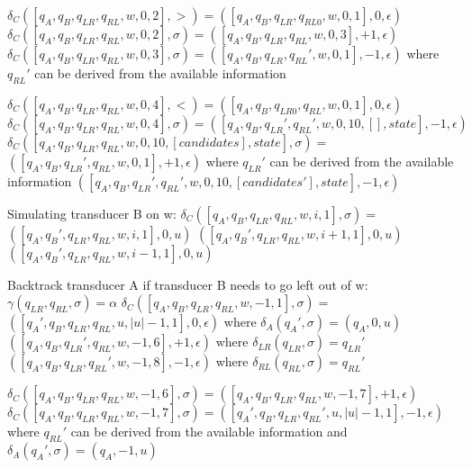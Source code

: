 \documentclass[12pt, a4paper]{article}
\begin{document}
\begin{algorithmic}
    \STATE $\delta_C([q_A, q_B, q_{LR}, q_{RL}, w, 0, 2], >) = ([q_A, q_B, q_{LR}, q_{RL0}, w, 0, 1], 0, \epsilon)$
    \STATE $\delta_C([q_A, q_B, q_{LR}, q_{RL}, w, 0, 2], \sigma) = ([q_A, q_B, q_{LR}, q_{RL}, w, 0, 3], +1, \epsilon)$
    \STATE $\delta_C([q_A, q_B, q_{LR}, q_{RL}, w, 0, 3], \sigma) = ([q_A, q_B, q_{LR}, q_{RL}', w, 0, 1], -1, \epsilon)$ where $q_{RL}'$ can be derived from the available information

    \STATE $\delta_C([q_A, q_B, q_{LR}, q_{RL}, w, 0, 4], <) = ([q_A, q_B, q_{LR0}, q_{RL}, w, 0, 1], 0, \epsilon)$
    \STATE $\delta_C([q_A, q_B, q_{LR}, q_{RL}, w, 0, 4], \sigma) = ([q_A, q_B, q_{LR}', q_{RL}', w, 0, 10, [], state], -1, \epsilon)$
    \STATE $\delta_C([q_A, q_B, q_{LR}, q_{RL}, w, 0, 10, [candidates], state], \sigma) = $
            \STATE $([q_A, q_B, q_{LR}', q_{RL}, w, 0, 1], +1, \epsilon)$ where $q_{LR}'$ can be derived from the available information
        \ELSE
            \STATE $([q_A, q_B, q_{LR}', q_{RL}', w, 0, 10, [candidates'], state], -1, \epsilon)$
        \ENDIF

    

    \STATE Simulating transducer B on w:
    \STATE $\delta_C([q_A, q_B, q_{LR}, q_{RL}, w, i, 1], \sigma) = $
            \STATE $([q_A, q_B', q_{LR}, q_{RL}, w, i, 1], 0, u)$ 
            \STATE $([q_A, q_B', q_{LR}, q_{RL}, w, i+1, 1], 0, u)$ 
            \STATE $([q_A, q_B', q_{LR}, q_{RL}, w, i-1, 1], 0, u)$ 
        \ENDIF

    \STATE Backtrack transducer A if transducer B needs to go left out of w:
    \STATE $\gamma(q_{LR}, q_{RL}, \sigma) = \alpha$
    \STATE $\delta_C([q_A, q_B, q_{LR}, q_{RL}, w, -1, 1], \sigma) = $\\
        \STATE $([q_A', q_B, q_{LR}, q_{RL}, u, |u| - 1, 1], 0, \epsilon)$ where $\delta_A(q_A', \sigma) = (q_A, 0, u)$
        \STATE $([q_A, q_B, q_{LR}', q_{RL}, w, -1, 6], +1, \epsilon)$ where $\delta_{LR}(q_{LR}, \sigma) = q_{LR}'$
        \STATE $([q_A, q_B, q_{LR}, q_{RL}', w, -1, 8], -1, \epsilon)$ where $\delta_{RL}(q_{RL}, \sigma) = q_{RL}'$
    \ENDIF

    \STATE $\delta_C([q_A, q_B, q_{LR}, q_{RL}, w, -1, 6], \sigma) = ([q_A, q_B, q_{LR}, q_{RL}, w, -1, 7], +1, \epsilon)$
    \STATE $\delta_C([q_A, q_B, q_{LR}, q_{RL}, w, -1, 7], \sigma) = ([q_A', q_B, q_{LR}, q_{RL}', u, |u|-1, 1], -1, \epsilon)$ where $q_{RL}'$ can be derived from the available information and $\delta_A(q_A', \sigma) = (q_A, -1, u)$


\end{algorithmic}
\end{document}
